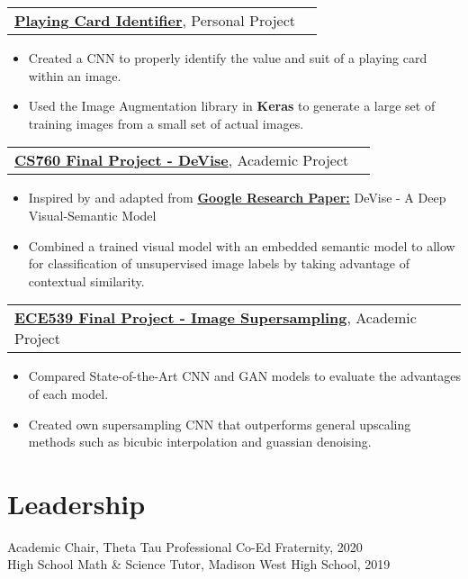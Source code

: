 \documentclass[letterpaper,11pt]{article}
\makeatletter
\newcommand{\projtitle}[2]{
  \vspace{7pt}
  \begin{tabular*}{1.00\textwidth}[t]{l@{\extracolsep{\fill}}r}
    \textbf{#1}, #2 \\
  \end{tabular*}\vspace{-5pt}
}
\newcommand{\expstart}{\begin{itemize}[leftmargin=5mm]}
\newcommand{\expend}{\end{itemize}\vspace{-5pt}}
\newcommand{\expitem}[1]{\item\small{{#1 \vspace{-5pt}}}}
\makeatother
\begin{document}
    \projtitle{\href{https://github.com/jth1011/Playing-Card-Identifier}{Playing Card Identifier}}{Personal Project}
  \expstart
    \expitem{Created a CNN to properly identify the value and suit of a playing card within an image.}
    \expitem{Used the Image Augmentation library in \textbf{Keras} to generate a large set of training images from a small set of actual images.}
  \expend
 
  \projtitle{\href{https://github.com/jth1011}{CS760 Final Project - DeVise}}{Academic Project}
  \expstart
    \expitem{Inspired by and adapted from \href{http://www.cs.toronto.edu/~ranzato/publications/frome_nips2013.pdf}{\textbf{Google Research Paper:}}}DeVise - A Deep Visual-Semantic Model
    \expitem{Combined a trained visual model with an embedded semantic model to allow for classification of unsupervised image labels by taking advantage of contextual similarity.}
  \expend
  
  \projtitle{\href{https://github.com/jth1011}{ECE539 Final Project - Image Supersampling}}{Academic Project}
  \expstart
    \expitem{Compared State-of-the-Art CNN and GAN models to evaluate the advantages of each model.}
    \expitem{Created own supersampling CNN that outperforms general upscaling methods such as bicubic interpolation and guassian denoising.}
  \expend

\section{Leadership}
   Academic Chair, Theta Tau Professional Co-Ed Fraternity, 2020 \\
   High School Math \& Science Tutor, Madison West High School, 2019

\end{document}
